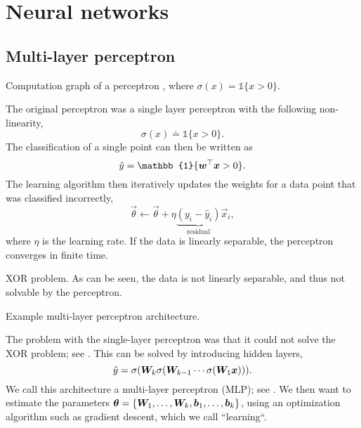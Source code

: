 \section{Neural networks}

\subsection{Multi-layer perceptron}

\begin{marginfigure}
    \centering
    \caption{Computation graph of a perceptron \citep{rosenblatt1958perceptron}, where $\sigma(x) = \mathbb{1}\{ x > 0 \}$.}
    \label{fig:perceptron}
\end{marginfigure}

The original perceptron \citep{rosenblatt1958perceptron} was a single layer perceptron with the
following non-linearity, \[
    \sigma(x) \doteq \mathbb{1}\{ x > 0 \}.
\]
The classification of a single point can then be written as \[
    \hat{y} = \mathbb{1}\{\transpose{\vec{w}}\vec{x} > 0\}.
\]
The learning algorithm then iteratively updates the weights for a data point that was classified
incorrectly, \[
    \vec{\theta} \gets \vec{\theta} + \eta \underbrace{(y_i - \hat{y}_i)}_{\text{residual}} \vec{x}_i,
\]
where $\eta$ is the learning rate. If the data is linearly separable, the perceptron converges in
finite time.

\begin{marginfigure}
    \centering
    \caption{XOR problem. As can be seen, the data is not linearly separable, and thus not solvable by the perceptron.}
    \label{fig:xor-problem}
\end{marginfigure}

\begin{marginfigure}
    \centering
    \caption{Example multi-layer perceptron architecture.}
    \label{fig:mlp}
\end{marginfigure}

The problem with the single-layer perceptron was that it could not solve the XOR problem; see
. This can be solved by introducing hidden layers, \[
    \hat{y} = \sigma(\bm{W}_k \sigma(\bm{W}_{k-1} \cdots \sigma(\bm{W}_1 \bm{x}))).
\]
We call this architecture a multi-layer perceptron (MLP); see . We then want to
estimate the parameters $\bm{\theta} = \{ \bm{W}_1,\ldots,\bm{W}_k,\bm{b}_1,\ldots,\bm{b}_k
    \}$, using an optimization algorithm such as gradient descent, which we call ``learning``.

